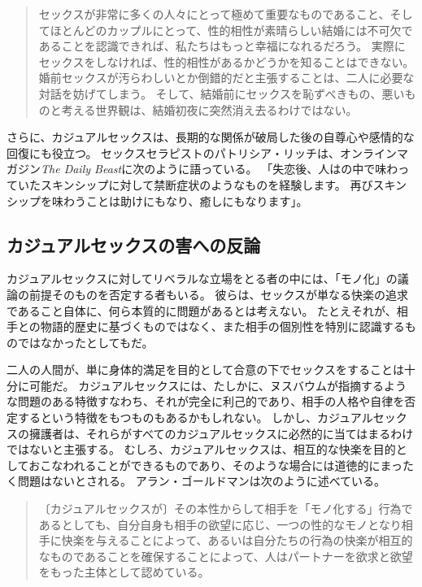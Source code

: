\documentclass[paper=a4,book,openany]{jlreq} \usepackage{mystyle}
\begin{document}
\begin{quote}
  セックスが非常に多くの人々にとって極めて重要なものであること、そしてほとんどのカップルにとって、性的相性が素晴らしい結婚には不可欠であることを認識できれば、私たちはもっと幸福になれるだろう。
実際にセックスをしなければ、性的相性があるかどうかを知ることはできない。
婚前セックスが汚らわしいとか倒錯的だと主張することは、二人に必要な対話を妨げてしまう。
そして、結婚前にセックスを恥ずべきもの、悪いものと考える世界観は、結婚初夜に突然消え去るわけではない。
\citep{filipovic12:_moral_case_sex_marr}
\end{quote}

さらに、カジュアルセックスは、長期的な関係が破局した後の自尊心や感情的な回復にも役立つ。
セックスセラピストのパトリシア・リッチは、オンラインマガジン\emph{The Daily Beast}に次のように語っている。
「失恋後、人はの中で味わっていたスキンシップに対して禁断症状のようなものを経験します。
再びスキンシップを味わうことは助けにもなり、癒しにもなります」\citep{shire14:_peop_who_have}。

\subsection{カジュアルセックスの害への反論}

カジュアルセックスに対してリベラルな立場をとる者の中には、「モノ化」の議論の前提そのものを否定する者もいる。
彼らは、セックスが単なる快楽の追求であること自体に、何ら本質的に問題があるとは考えない。
たとえそれが、相手との物語的歴史に基づくものではなく、また相手の個別性を特別に認識するものではなかったとしてもだ。

二人の人間が、単に身体的満足を目的として合意の下でセックスをすることは十分に可能だ。
カジュアルセックスには、たしかに、ヌスバウムが指摘するような問題のある特徴{\DDASH}すなわち、それが完全に利己的であり、相手の人格や自律を否定するという特徴{\DDASH}をもつものもあるかもしれない。
しかし、カジュアルセックスの擁護者は、それらがすべてのカジュアルセックスに必然的に当てはまるわけではないと主張する。
むしろ、カジュアルセックスは、相互的な快楽を目的としておこなわれることができるものであり、そのような場合には道徳的にまったく問題はないとされる。
アラン・ゴールドマンは次のように述べている。

\begin{quote}
〔カジュアルセックスが〕その本性からして相手を「モノ化する」行為であるとしても、自分自身も相手の欲望に応じ、一つの性的なモノとなり相手に快楽を与えることによって、あるいは自分たちの行為の快楽が相互的なものであることを確保することによって、人はパートナーを欲求と欲望をもった主体として認めている。
\citep[p. 283]{goldman77:_plain_sex}
\end{quote}
\end{document}
